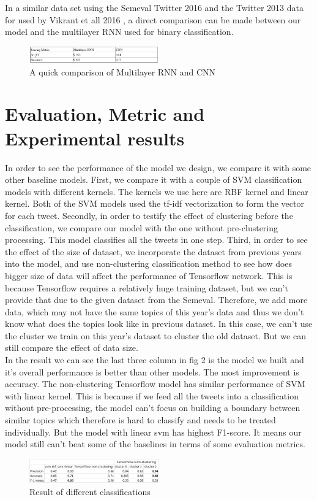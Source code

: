 \documentclass[conference]{IEEEtran}
\begin{document}
In a similar data set using the Semeval Twitter 2016 and the Twitter 2013 data for used by Vikrant et all 2016 , a direct comparison can be made between our model and the multilayer RNN used for binary classification. 
\begin{figure}[h]
\centering
\includegraphics[width=0.5\textwidth]{Capture(6)}
\caption{A quick comparison of Multilayer RNN and CNN}

\end{figure}

\section{Evaluation, Metric and Experimental results}
In order to see the performance of the model we design, we compare it with some other baseline models. First, we compare it with a couple of SVM classification models with different kernels. The kernels we use here are RBF kernel and linear kernel. Both of the SVM models used the tf-idf vectorization to form the vector for each tweet. Secondly, in order to testify the effect of clustering before the classification, we compare our model with the one without pre-clustering processing. This model classifies all the tweets in one step.
Third, in order to see the effect of the size of dataset, we incorporate the dataset from previous years into the model, and use non-clustering classification method to see how does bigger size of data will affect the performance of Tensorflow network. This is because Tensorflow requires a relatively huge training dataset, but we can't provide that due to the given dataset from the Semeval. Therefore, we add more data, which may not have the same topics of this year's data and thus we don't know what does the topics look like in previous dataset. In this case, we can't use the cluster we train on this year's dataset to cluster the old dataset. But we can still compare the effect of data size.
\\ \indent
In the result we can see the last three column in fig 2 is the model we built and it's overall performance is better than other models. The most improvement is accuracy. The non-clustering Tensorflow model has similar performance of SVM with linear kernel. This is because if we feed all the tweets into a classification without pre-processing, the model can't focus on building a boundary between similar topics which therefore is hard to classify and needs to be treated individually. But the model with linear svm has highest F1-score. It means our model still can't beat some of the baselines in terms of some evaluation metrics.
\\ \indent
\begin{figure}[h]
\centering
\includegraphics[width=0.5\textwidth]{Capture}
\caption{Result of different classifications}

\end{figure}
\end{document}
